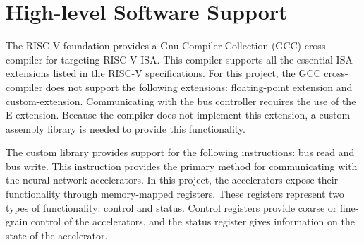 \documentclass[../main.tex]{subfiles}
\begin{document}
\section{High-level Software Support}
\label{sec:software-support}
The RISC-V foundation provides a Gnu Compiler Collection (GCC) cross-compiler for targeting RISC-V ISA. This compiler supports all the essential ISA extensions listed in the RISC-V specifications\cite{RISC-V-isa}. For this project, the GCC cross-compiler does not support the following extensions: floating-point extension and custom-extension. Communicating with the bus controller requires the use of the E extension. Because the compiler does not implement this extension, a custom assembly library is needed to provide this functionality.  

The custom library provides support for the following instructions: bus read and bus write. This instruction provides the primary method for communicating with the neural network accelerators.  In this project, the accelerators expose their functionality through memory-mapped registers. These registers represent two types of functionality: control and status. Control registers provide coarse or fine-grain control of the accelerators, and the status register gives information on the state of the accelerator. 
\end{document}
